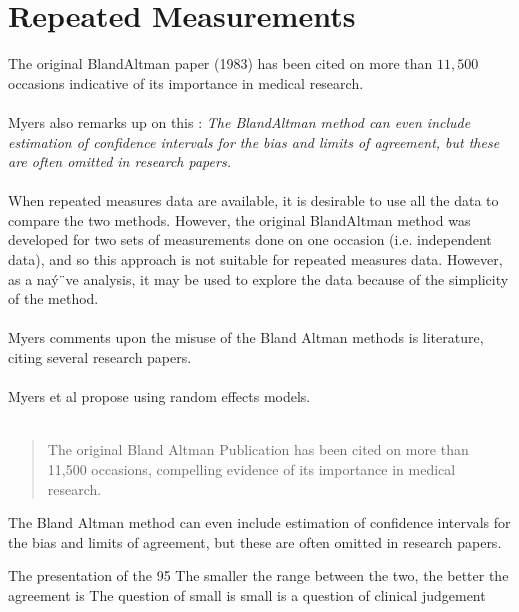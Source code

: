 \documentclass[MAIN.tex]{subfiles}
\begin{document}
\section{Repeated Measurements}
The original BlandAltman paper (1983) has been cited on more than
$11,500$ occasions indicative of its importance in medical
research.
\\
\\
Myers also remarks up on this : \emph{The BlandAltman method can
even include estimation of confidence intervals for the bias and
limits of agreement, but these are often omitted in research
papers.}
\\
\\
When repeated measures data are available, it is desirable to use
all the data to compare the two methods. However, the original
BlandAltman method was developed for two sets of measurements
done on one occasion (i.e. independent data), and so this approach
is not suitable for repeated measures data. However, as a naý¨ve
analysis, it may be used to explore the data because of the
simplicity of the method.
\\
\\
Myers comments upon the misuse of the Bland Altman methods is
literature, citing several research papers.
\\
\\
Myers et al propose using random effects models.
\\
\\



\begin{quote}
The original Bland Altman Publication has been cited on more than 11,500 occasions, compelling evidence of its 
importance in medical research.
\end{quote}

The Bland Altman method can even include estimation of confidence intervals for the bias and limits of agreement, 
but these are often omitted in research papers.

The presentation of the 95%
The smaller the range between the two, the better the agreement is 
The question of small is small is a question of clinical judgement
\end{document}
